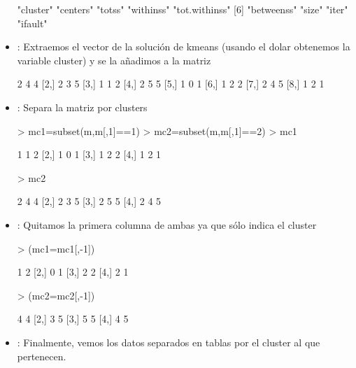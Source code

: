\documentclass[a4paper, 12pt]{article}
\begin{document}
\begin{itemize}
\begin{Schunk}
\begin{Soutput}
[1] "cluster"      "centers"      "totss"        "withinss"     "tot.withinss"
[6] "betweenss"    "size"         "iter"         "ifault"      
\end{Soutput}
\end{Schunk}
		\item \texttt{}: 
		Extraemos el vector de la solución de kmeans  (usando el dolar obtenemos la variable cluster) y se la añadimos a la matriz
\begin{Schunk}
\begin{Soutput}
     [,1] [,2] [,3]
[1,]    2    4    4
[2,]    2    3    5
[3,]    1    1    2
[4,]    2    5    5
[5,]    1    0    1
[6,]    1    2    2
[7,]    2    4    5
[8,]    1    2    1
\end{Soutput}
\end{Schunk}
		\item \texttt{}: 
		Separa la matriz por clusters
\begin{Schunk}
\begin{Sinput}
> mc1=subset(m,m[,1]==1)
> mc2=subset(m,m[,1]==2)
> mc1
\end{Sinput}
\begin{Soutput}
     [,1] [,2] [,3]
[1,]    1    1    2
[2,]    1    0    1
[3,]    1    2    2
[4,]    1    2    1
\end{Soutput}
\begin{Sinput}
> mc2
\end{Sinput}
\begin{Soutput}
     [,1] [,2] [,3]
[1,]    2    4    4
[2,]    2    3    5
[3,]    2    5    5
[4,]    2    4    5
\end{Soutput}
\end{Schunk}
		\item \texttt{}: 
		Quitamos la primera columna de ambas ya que sólo indica el cluster
\begin{Schunk}
\begin{Sinput}
> (mc1=mc1[,-1])
\end{Sinput}
\begin{Soutput}
     [,1] [,2]
[1,]    1    2
[2,]    0    1
[3,]    2    2
[4,]    2    1
\end{Soutput}
\begin{Sinput}
> (mc2=mc2[,-1])
\end{Sinput}
\begin{Soutput}
     [,1] [,2]
[1,]    4    4
[2,]    3    5
[3,]    5    5
[4,]    4    5
\end{Soutput}
\end{Schunk}
		\item \texttt{}: 
		Finalmente, vemos los datos separados en tablas por el cluster al que pertenecen.

	\end{itemize}
	
\end{document}
